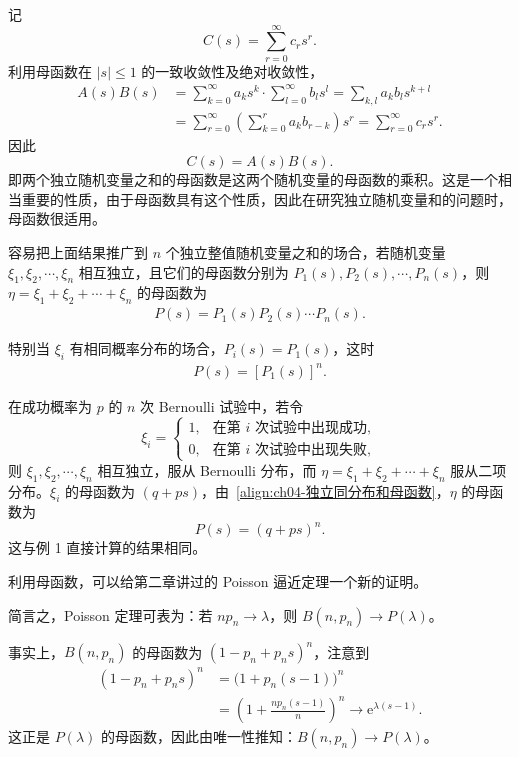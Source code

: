 \documentclass[../../main.tex]{subfiles}
\begin{document}
记
\[
C(s)=\sum_{r=0}^{\infty}c_r s^r.
\]
利用母函数在 $|s|\leqslant 1$ 的一致收敛性及绝对收敛性，
\begin{align*}
A(s)B(s)&=\sum_{k=0}^{\infty}a_k s^k\cdot\sum_{l=0}^{\infty}b_l s^l=\sum_{k,l}a_k b_l s^{k+l}\\
&=\sum_{r=0}^{\infty}\left(\sum_{k=0}^r a_k b_{r-k}\right)s^r=\sum_{r=0}^{\infty}c_r s^r.
\end{align*}
因此
\[
C(s)=A(s)B(s).
\]
即两个独立随机变量之和的母函数是这两个随机变量的母函数的乘积。这是一个相当重要的性质，由于母函数具有这个性质，因此在研究独立随机变量和的问题时，母函数很适用。

容易把上面结果推广到 $n$ 个独立整值随机变量之和的场合，若随机变量 $\xi_1,\xi_2,\cdots,\xi_n$ 相互独立，且它们的母函数分别为 $P_1(s),P_2(s),\cdots,P_n(s)$，则 $\eta=\xi_1+\xi_2+\cdots+\xi_n$ 的母函数为
\begin{align}
P(s)=P_1(s)P_2(s)\cdots P_n(s).\label{align:ch04-独立和母函数}
\end{align}

特别当 $\xi_i$ 有相同概率分布的场合，$P_i(s)=P_1(s)$，这时
\begin{align}
P(s)=[P_1(s)]^n.\label{align:ch04-独立同分布和母函数}
\end{align}

\begin{example}[二项分布的母函数再推导]\label{example:ch04-二项母函数再推导}
在成功概率为 $p$ 的 $n$ 次 Bernoulli 试验中，若令
\[
\xi_i=\begin{cases}
1,&\text{在第 }i\text{ 次试验中出现成功},\\
0,&\text{在第 }i\text{ 次试验中出现失败},
\end{cases}
\]
则 $\xi_1,\xi_2,\cdots,\xi_n$ 相互独立，服从 Bernoulli 分布，而 $\eta=\xi_1+\xi_2+\cdots+\xi_n$ 服从二项分布。$\xi_i$ 的母函数为 $(q+ps)$，由~\eqref{align:ch04-独立同分布和母函数}，$\eta$ 的母函数为
\[
P(s)=(q+ps)^n.
\]
这与例 1 直接计算的结果相同。

利用母函数，可以给第二章讲过的 Poisson 逼近定理一个新的证明。

简言之，Poisson 定理可表为：若 $np_n\to\lambda$，则 $B(n,p_n)\to P(\lambda)$。

事实上，$B(n,p_n)$ 的母函数为 $(1-p_n+p_n s)^n$，注意到
\begin{align*}
(1-p_n+p_n s)^n&=\bigl(1+p_n(s-1)\bigr)^n\\
&=\left(1+\frac{np_n(s-1)}{n}\right)^n\to\mathrm{e}^{\lambda(s-1)}.
\end{align*}
这正是 $P(\lambda)$ 的母函数，因此由唯一性推知：$B(n,p_n)\to P(\lambda)$。
\end{example}
\end{document}
